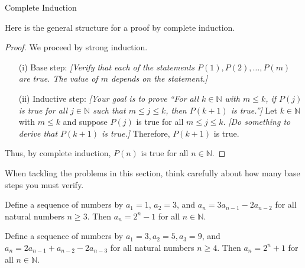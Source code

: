 \begin{section}{Complete Induction}
\begin{skeleton}
Here is the general structure for a proof by complete induction.

\begin{mdframed}[style=skeleton]
\begin{proof}
We proceed by strong induction.
\begin{enumerate}\setlength{\itemsep}{0in}
\item[(i)] Base step: \emph{[Verify that each of the statements $P(1),P(2),\ldots, P(m)$ are true.  The value of $m$ depends on the statement.]}

\item[(ii)] Inductive step:  \emph{[Your goal is to prove ``For all $k\in\mathbb{N}$ with $m\leq k$, if $P(j)$ is true for all $j\in \mathbb{N}$ such that $m\leq j \leq k$, then $P(k+1)$ is true.'']} Let $k \in \mathbb{N}$ with $m\leq k$ and suppose $P(j)$ is true for all $m\leq j \leq k$. \emph{[Do something to derive that $P(k+1)$ is true.]} Therefore, $P(k+1)$ is true.
\end{enumerate}
Thus, by complete induction, $P(n)$ is true for all $n \in\mathbb{N}$.
\end{proof}
\end{mdframed}
\end{skeleton}

When tackling the problems in this section, think carefully about how many base steps you must verify.

\begin{theorem}
Define a sequence of numbers by $a_1 = 1$, $a_2 = 3$, and $a_n = 3a_{n-1} - 2a_{n-2}$ for all natural numbers $n \geq 3$.  Then $a_n = 2^n - 1$ for all $n \in \mathbb{N}$.  
\end{theorem}

\begin{theorem}
Define a sequence of numbers by $a_1 = 3, a_2 = 5, a_3 = 9$, and $a_n = 2a_{n-1} + a_{n-2}-2a_{n-3}$ for all natural numbers $n \geq 4$.  Then $a_n = 2^n + 1$ for all $n \in \mathbb{N}$.  
\end{theorem}




\end{section}
